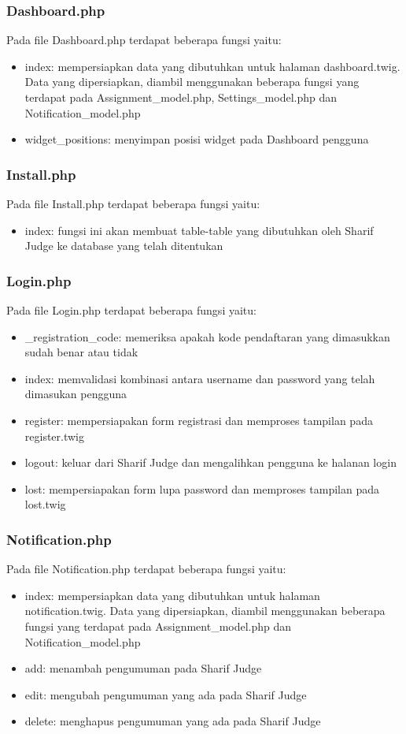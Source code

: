 \subsubsection{Dashboard.php}
Pada file Dashboard.php terdapat beberapa fungsi yaitu:
\begin{itemize}
	\item index: mempersiapkan data yang dibutuhkan untuk halaman dashboard.twig. Data yang dipersiapkan, diambil menggunakan beberapa fungsi yang terdapat pada Assignment\_model.php, Settings\_model.php dan Notification\_model.php
	\item widget\_positions: menyimpan posisi widget pada Dashboard pengguna
\end{itemize}

\subsubsection{Install.php}
Pada file Install.php terdapat beberapa fungsi yaitu:
\begin{itemize}
	\item index: fungsi ini akan membuat table-table yang dibutuhkan oleh Sharif Judge ke database yang telah ditentukan
\end{itemize}

\subsubsection{Login.php}
Pada file Login.php terdapat beberapa fungsi yaitu:
\begin{itemize}
	\item \_registration\_code: memeriksa apakah kode pendaftaran yang dimasukkan sudah benar atau tidak
	\item index: memvalidasi kombinasi antara username dan password yang telah dimasukan pengguna
	\item register: mempersiapakan form registrasi dan memproses tampilan pada register.twig
	\item logout: keluar dari Sharif Judge dan mengalihkan pengguna ke halanan login
	\item lost: mempersiapakan form lupa password dan memproses tampilan pada lost.twig
\end{itemize}

\subsubsection{Notification.php}
Pada file Notification.php terdapat beberapa fungsi yaitu:
\begin{itemize}
	\item index: mempersiapkan data yang dibutuhkan untuk halaman notification.twig. Data yang dipersiapkan, diambil menggunakan beberapa fungsi yang terdapat pada Assignment\_model.php dan Notification\_model.php
	\item add: menambah pengumuman pada Sharif Judge
	\item edit: mengubah pengumuman yang ada pada Sharif Judge
	\item delete: menghapus pengumuman yang ada pada Sharif Judge
\end{itemize}

